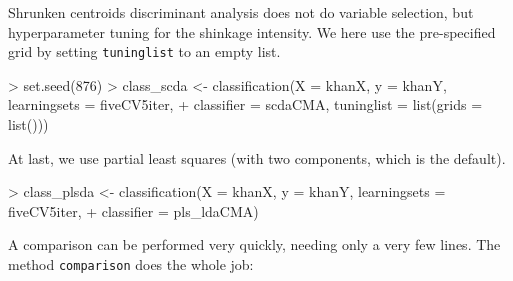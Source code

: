 Shrunken centroids discriminant analysis does not do variable selection, but
hyperparameter tuning for the shinkage intensity. We here use the pre-specified
grid by setting \texttt{tuninglist} to an empty list. 

\begin{Schunk}
\begin{Sinput}
> set.seed(876)
> class_scda <- classification(X = khanX, y = khanY, learningsets = fiveCV5iter, 
+     classifier = scdaCMA, tuninglist = list(grids = list()))
\end{Sinput}
\end{Schunk}
                             
At last, we use partial least squares (with two components, which is the default).

\begin{Schunk}
\begin{Sinput}
> class_plsda <- classification(X = khanX, y = khanY, learningsets = fiveCV5iter, 
+     classifier = pls_ldaCMA)
\end{Sinput}
\end{Schunk}

A comparison can be performed very quickly, needing only a very few lines. The method
\texttt{comparison} does the whole job: 

